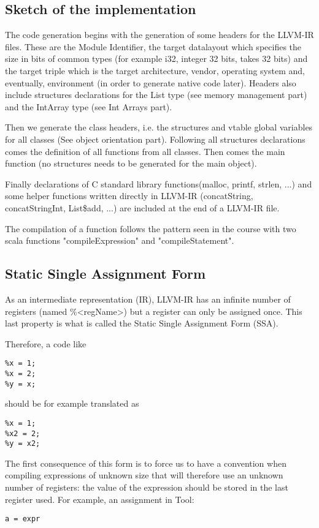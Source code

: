\subsection{Sketch of the implementation}
The code generation begins with the generation of some headers for the LLVM-IR files. These are the Module Identifier, the target datalayout which specifies the size in bits of common types (for example i32, integer 32 bits, takes 32 bits) and the target triple which is the target architecture, vendor, operating system and, eventually, environment (in order to generate native code later). Headers also include structures declarations for the List type (see memory management part) and the IntArray type (see Int Arrays part).

Then we generate the class headers, i.e. the structures and vtable global variables for all classes (See object orientation part). Following all structures declarations comes the definition of all functions from all classes. Then comes the main function (no structures needs to be generated for the main object).

Finally declarations of C standard library functions(malloc, printf, strlen, ...) and some helper functions written directly in LLVM-IR (concatString, concatStringInt, List\$add, ...) are included at the end of a LLVM-IR file.

The compilation of a function follows the pattern seen in the course with two scala functions "compileExpression" and "compileStatement".

\subsection{Static Single Assignment Form}
As an intermediate representation (IR), LLVM-IR has an infinite number of registers (named \%\textless regName\textgreater ) but a register can only be assigned once. This last property is what is called the Static Single Assignment Form (SSA).

Therefore, a code like
\begin{lstlisting}
%x = 1;
%x = 2;
%y = x;
\end{lstlisting}

should be for example translated as
\begin{lstlisting}
%x = 1;
%x2 = 2;
%y = x2;
\end{lstlisting}

The first consequence of this form is to force us to have a convention when compiling expressions of unknown size that will therefore use an unknown number of registers: the value of the expression should be stored in the last register used. For example, an assignment in Tool:
\begin{lstlisting}
a = expr
\end{lstlisting}

